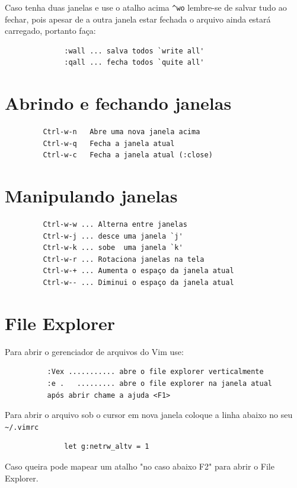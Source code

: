 \documentclass[10pt,a4paper,openany]{book}
\begin{document}
Caso tenha duas janelas e use o atalho acima \verb|^wo| lembre-se de salvar
tudo ao fechar, pois apesar de a outra janela estar fechada o arquivo
ainda estará carregado, portanto faça:

\begin{verbatim}
			  :wall ... salva todos `write all'
			  :qall ... fecha todos `quite all'
\end{verbatim}

\section{Abrindo e fechando janelas }

\begin{verbatim}
		 Ctrl-w-n   Abre uma nova janela acima
		 Ctrl-w-q   Fecha a janela atual
		 Ctrl-w-c   Fecha a janela atual (:close)
\end{verbatim}

\section{Manipulando janelas }

\begin{verbatim}
		 Ctrl-w-w ... Alterna entre janelas
		 Ctrl-w-j ... desce uma janela `j'
		 Ctrl-w-k ... sobe  uma janela `k'
		 Ctrl-w-r ... Rotaciona janelas na tela
		 Ctrl-w-+ ... Aumenta o espaço da janela atual
		 Ctrl-w-- ... Diminui o espaço da janela atual
\end{verbatim}

\section{File Explorer }
\label{File Explorer }
Para abrir o gerenciador de arquivos do Vim use:

\begin{verbatim}
		  :Vex ........... abre o file explorer verticalmente
		  :e .   ......... abre o file explorer na janela atual
		  após abrir chame a ajuda <F1>
\end{verbatim}

Para abrir o arquivo sob o cursor em nova janela coloque a linha abaixo no seu \verb|~/.vimrc|

\begin{verbatim}
			  let g:netrw_altv = 1
\end{verbatim}

Caso queira pode mapear um atalho "no caso abaixo F2" para abrir o File Explorer.
\end{document}
